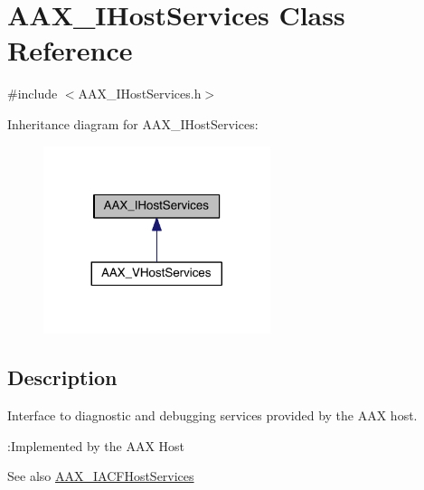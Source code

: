 \hypertarget{a00103}{}\section{A\+A\+X\+\_\+\+I\+Host\+Services Class Reference}
\label{a00103}


{\ttfamily \#include $<$A\+A\+X\+\_\+\+I\+Host\+Services.\+h$>$}



Inheritance diagram for A\+A\+X\+\_\+\+I\+Host\+Services\+:
\nopagebreak
\begin{figure}[H]
\begin{center}
\leavevmode
\includegraphics[width=188pt]{a00640}
\end{center}
\end{figure}


\subsection{Description}
Interface to diagnostic and debugging services provided by the A\+A\+X host. 

\begin{DoxyRefDesc}{\+:\+Implemented by the A\+A\+X Host}
\item[\hyperlink{a00001__aax_host_implementation000008}{\+:\+Implemented by the A\+A\+X Host}]\end{DoxyRefDesc}


\begin{DoxySeeAlso}{See also}
\hyperlink{a00071}{A\+A\+X\+\_\+\+I\+A\+C\+F\+Host\+Services} 
\end{DoxySeeAlso}
